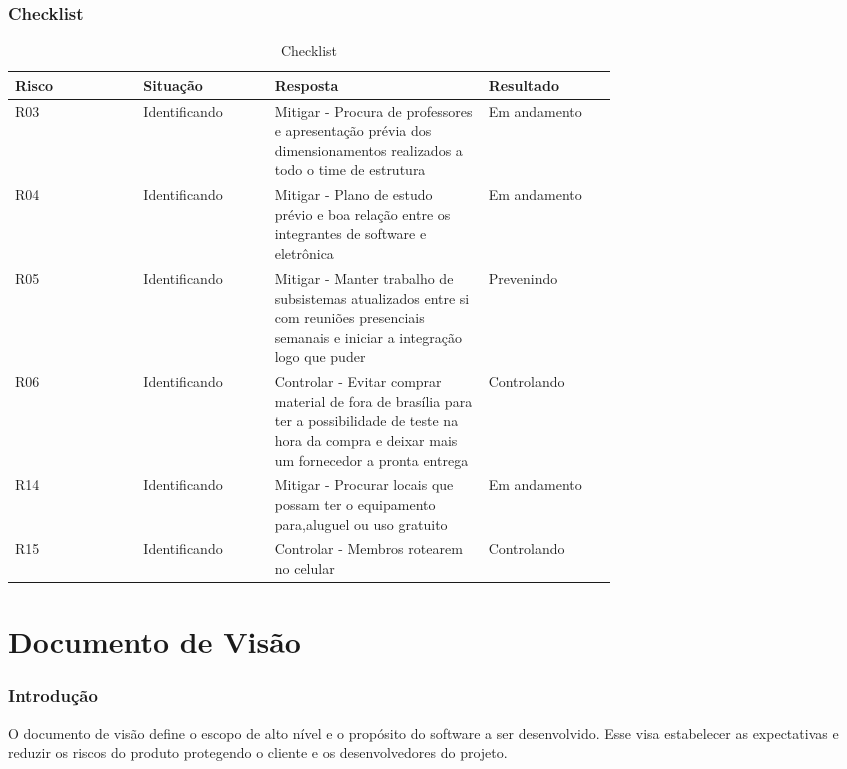 \begin{apendicesenv}
\subsection{Checklist}
\begin{table}[!htp]
    \centering
    \caption{Checklist}
    \label{my-label}
    \begin{tabular}{|p{0.15\linewidth}|p{0.15\linewidth}|p{0.25\linewidth}|p{0.15\linewidth}|}
    \hline
    \textbf{Risco} & \textbf{Situação} & \textbf{Resposta} & \textbf{Resultado} \\ \hline
    R03 & Identificando & Mitigar - Procura de professores e apresentação prévia dos dimensionamentos realizados a todo o time de estrutura & Em andamento \\ \hline
    R04 & Identificando & Mitigar - Plano de estudo prévio e boa relação entre os integrantes de software e eletrônica & Em andamento \\ \hline
    R05 & Identificando & Mitigar - Manter trabalho de subsistemas atualizados entre si com reuniões presenciais semanais e iniciar a integração logo que puder & Prevenindo \\ \hline
    R06 & Identificando & Controlar - Evitar comprar material de fora de brasília para ter a possibilidade de teste na hora da compra e deixar mais um fornecedor a pronta entrega & Controlando \\ \hline
    R14 & Identificando & Mitigar - Procurar locais que possam ter o equipamento para,aluguel ou uso gratuito & Em andamento \\ \hline
    R15 & Identificando & Controlar - Membros rotearem no celular & Controlando \\ \hline
    \end{tabular}
\end{table}

\end{apendicesenv}


\chapter{Documento de Visão}

\subsection{Introdução}
O documento de visão define o escopo de alto nível e o propósito do software a ser desenvolvido. Esse visa estabelecer as expectativas e reduzir os riscos do produto protegendo o cliente e os desenvolvedores do projeto.

